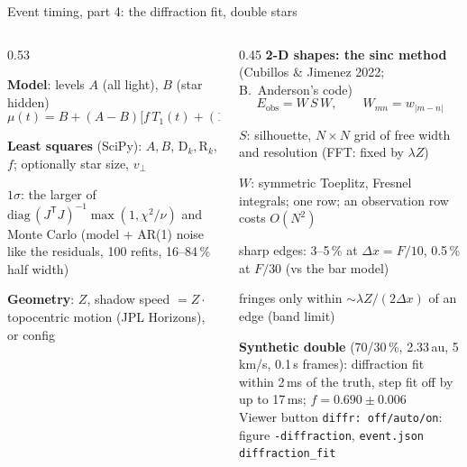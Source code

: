 \begin{frame}{Event timing, part 4: the diffraction fit, double stars}
  \tightdisplays
  \begin{columns}[T]
  \begin{column}{0.53\textwidth}
    \scriptsize
    \begin{tightenum}
      \item \textbf{Model}: levels $A$ (all light), $B$ (star hidden)
        \[ \mu(t) = B + (A - B)\bigl[f\,T_1(t) + (1-f)\,T_2(t)\bigr] \]
      \item \textbf{Least squares} (SciPy): $A, B$, $\mathrm D_k, \mathrm R_k$, $f$; optionally star size, $v_\perp$
      \item \textbf{$1\sigma$}: the larger of $\mathrm{diag}\,(J^\mathsf T J)^{-1}\max(1, \chi^2/\nu)$ and
        Monte Carlo (model + AR(1) noise like the residuals, 100 refits, 16--84\,\% half width)
      \item \textbf{Geometry}: $Z$, shadow speed $= Z\cdot$topocentric motion (JPL Horizons), or config
    \end{tightenum}
  \end{column}
  \begin{column}{0.45\textwidth}
    \scriptsize
    \textbf{2-D shapes: the sinc method} (Cubillos \& Jimenez 2022; B.~Anderson's code)
    \[ E_\mathrm{obs} = W\,S\,W, \qquad W_{mn} = w_{|m-n|} \]
    \begin{tightlist}
      \item $S$: silhouette, $N\times N$ grid of free width and resolution (FFT: fixed by $\lambda Z$)
      \item $W$: symmetric Toeplitz, Fresnel integrals; one row; an observation row costs $O(N^2)$
      \item sharp edges: 3--5\,\% at $\Delta x = F/10$, 0.5\,\% at $F/30$ (vs the bar model)
      \item fringes only within $\sim\lambda Z/(2\Delta x)$ of an edge (band limit)
    \end{tightlist}
    \vspace{0.5ex}
    \textbf{Synthetic double} (70/30\,\%, 2.33\,au, 5\,km/s, 0.1\,s frames): diffraction fit within 2\,ms of the
    truth, step fit off by up to 17\,ms; $f = 0.690 \pm 0.006$\\[0.4ex]
    Viewer button \texttt{diffr: off/auto/on}: figure \texttt{-diffraction}, \texttt{event.json} \texttt{diffraction\_fit}
  \end{column}
  \end{columns}
\end{frame}


